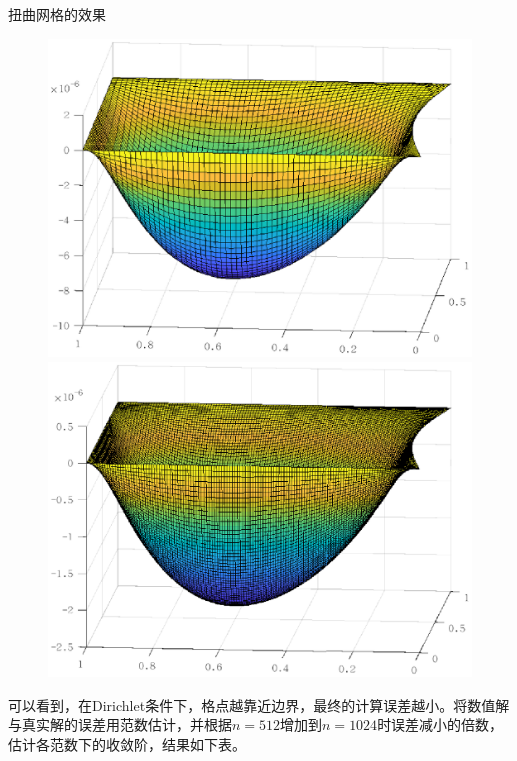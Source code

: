 \documentclass[9pt]{beamer}
\begin{document}
\begin{frame}{扭曲网格的效果}
\begin{figure}[H]
\begin{minipage}[t]{0.24\linewidth}
    \centering
    \includegraphics[width=0.95\linewidth]{../report/figure/3-1-3.eps}
  \end{minipage}
  \begin{minipage}[t]{0.24\linewidth}
    \centering
    \includegraphics[width=0.95\linewidth]{../report/figure/3-1-4.eps}
  \end{minipage}
\end{figure}

可以看到，在Dirichlet条件下，格点越靠近边界，最终的计算误差越小。将数值解与真实解的误差用范数估计，并根据$n=512$增加到$n=1024$时误差减小的倍数，估计各范数下的收敛阶，结果如下表。


\end{frame}
\end{document}

